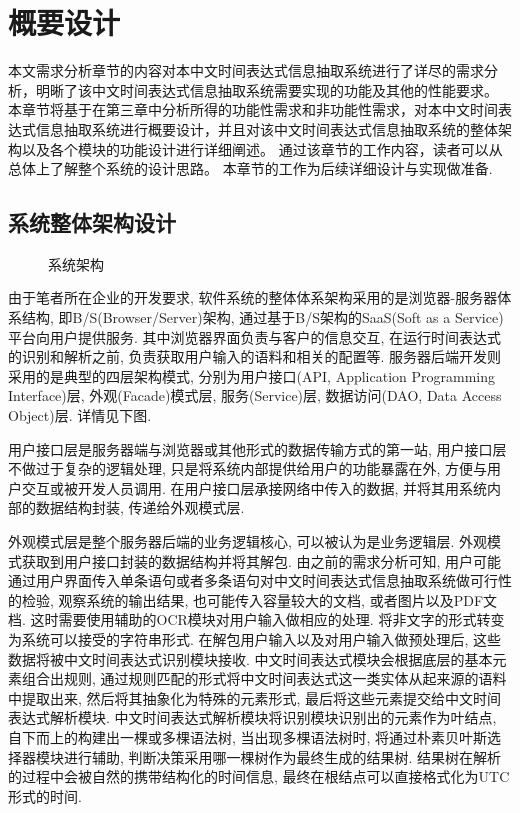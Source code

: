 

\chapter{概要设计}

本文需求分析章节的内容对本中文时间表达式信息抽取系统进行了详尽的需求分析，明晰了该中文时间表达式信息抽取系统需要实现的功能及其他的性能要求。
本章节将基于在第三章中分析所得的功能性需求和非功能性需求，对本中文时间表达式信息抽取系统进行概要设计，并且对该中文时间表达式信息抽取系统的整体架构以及各个模块的功能设计进行详细阐述。
通过该章节的工作内容，读者可以从总体上了解整个系统的设计思路。
本章节的工作为后续详细设计与实现做准备.

\section{系统整体架构设计}

\begin{figure}[h]
  \centering
  \caption{系统架构}
  \label{fig:architect}
\end{figure}

由于笔者所在企业的开发要求, 软件系统的整体体系架构采用的是浏览器-服务器体系结构, 即B/S(Browser/Server)架构, 通过基于B/S架构的SaaS(Soft as a Service)平台向用户提供服务.
其中浏览器界面负责与客户的信息交互, 在运行时间表达式的识别和解析之前, 负责获取用户输入的语料和相关的配置等.
服务器后端开发则采用的是典型的四层架构模式, 分别为用户接口(API, Application Programming Interface)层, 外观(Facade)模式层, 服务(Service)层, 数据访问(DAO, Data Access Object)层. 详情见下图.

用户接口层是服务器端与浏览器或其他形式的数据传输方式的第一站, 用户接口层不做过于复杂的逻辑处理, 只是将系统内部提供给用户的功能暴露在外, 方便与用户交互或被开发人员调用.
在用户接口层承接网络中传入的数据, 并将其用系统内部的数据结构封装, 传递给外观模式层.

外观模式层是整个服务器后端的业务逻辑核心, 可以被认为是业务逻辑层. 外观模式获取到用户接口封装的数据结构并将其解包.
由之前的需求分析可知, 用户可能通过用户界面传入单条语句或者多条语句对中文时间表达式信息抽取系统做可行性的检验, 观察系统的输出结果,
也可能传入容量较大的文档, 或者图片以及PDF文档. 这时需要使用辅助的OCR模块对用户输入做相应的处理. 将非文字的形式转变为系统可以接受的字符串形式.
在解包用户输入以及对用户输入做预处理后, 这些数据将被中文时间表达式识别模块接收.
中文时间表达式模块会根据底层的基本元素组合出规则, 通过规则匹配的形式将中文时间表达式这一类实体从起来源的语料中提取出来, 然后将其抽象化为特殊的元素形式, 最后将这些元素提交给中文时间表达式解析模块.
中文时间表达式解析模块将识别模块识别出的元素作为叶结点, 自下而上的构建出一棵或多棵语法树, 当出现多棵语法树时, 将通过朴素贝叶斯选择器模块进行辅助, 判断决策采用哪一棵树作为最终生成的结果树.
结果树在解析的过程中会被自然的携带结构化的时间信息, 最终在根结点可以直接格式化为UTC形式的时间.

